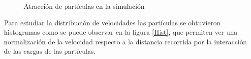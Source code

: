 \documentclass[12pt, letterpaper] {article}
\begin{document}
\begin{figure}[H]
\caption{Atracción de partículas en la simulación}\label{SimF}
\end{figure}

Para estudiar la distribución de velocidades las partículas se obtuvieron histogramas como se puede observar en la figura \ref{Hist}, que permiten ver una normalización de la velocidad respecto a la distancia recorrida por la interacción de las cargas de las partículas.
\end{document}
